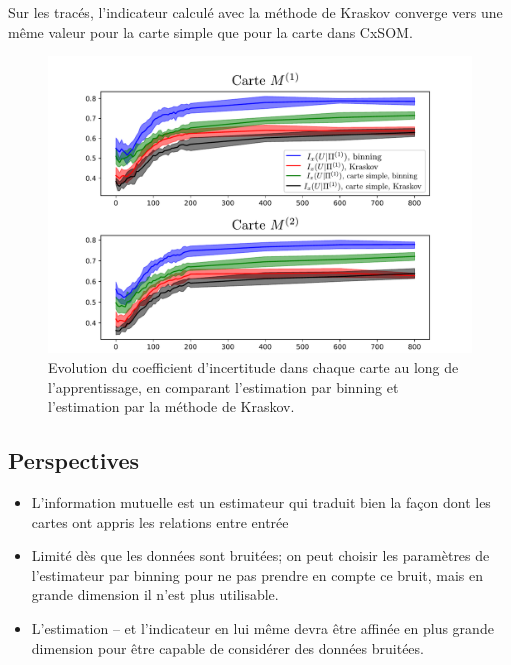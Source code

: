 Sur les tracés, l'indicateur calculé avec la méthode de Kraskov converge vers une même valeur pour la carte simple que pour la carte dans CxSOM. 

\begin{figure}
\includegraphics[width=\textwidth]{evolution_MI}
\caption{Evolution du coefficient d'incertitude dans chaque carte au long de l'apprentissage, en comparant l'estimation par binning et l'estimation par la méthode de Kraskov.}
\label{fig:MI_evol_total}
\end{figure}

\subsection{Perspectives}
\begin{itemize}
    \item L'information mutuelle est un estimateur qui traduit bien la façon dont les cartes ont appris les relations entre entrée
    \item Limité dès que les données sont bruitées; on peut choisir les paramètres de l'estimateur par binning pour ne pas prendre en compte ce bruit, mais en grande dimension il n'est plus utilisable.
    \item L'estimation -- et l'indicateur en lui même devra être affinée en plus grande dimension pour être capable de considérer des données bruitées. 
\end{itemize}


